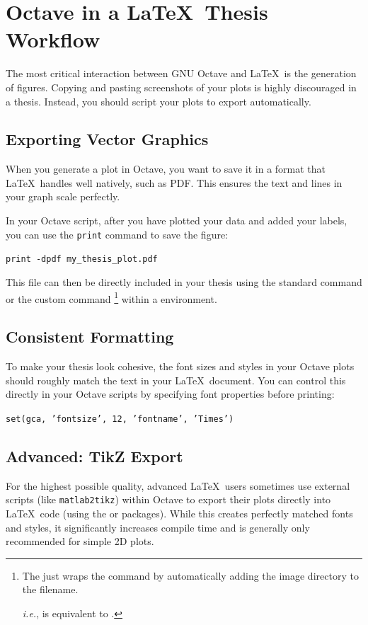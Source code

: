 	\section{Octave in a \LaTeX\ Thesis Workflow}
		The most critical interaction between GNU Octave and \LaTeX\ is the generation of figures. 
		Copying and pasting screenshots of your plots is highly discouraged in a thesis. 
		Instead, you should script your plots to export automatically.

		\subsection{Exporting Vector Graphics}
			When you generate a plot in Octave, you want to save it in a format that \LaTeX\ handles well natively, such as PDF. 
			This ensures the text and lines in your graph scale perfectly.

			In your Octave script, after you have plotted your data and added your labels, you can use the \texttt{print} command to save the figure:
			\begin{center}
				\texttt{print -dpdf my\_thesis\_plot.pdf}
			\end{center}
			This file can then be directly included in your thesis using the standard  command or the custom command \footnote{The  just wraps the  command by automatically adding the image directory to the filename. \par\textit{i.e.},  is equivalent to .} within a  environment.

		\subsection{Consistent Formatting}
			To make your thesis look cohesive, the font sizes and styles in your Octave plots should roughly match the text in your \LaTeX\ document. You can control this directly in your Octave scripts by specifying font properties before printing:
			\begin{center}
				\texttt{set(gca, 'fontsize', 12, 'fontname', 'Times')}
			\end{center}

		\subsection{Advanced: TikZ Export}
			For the highest possible quality, advanced \LaTeX\ users sometimes use external scripts (like \texttt{matlab2tikz}) within Octave to export their plots directly into \LaTeX\ code (using the  or  packages). 
			While this creates perfectly matched fonts and styles, it significantly increases compile time and is generally only recommended for simple 2D plots.

